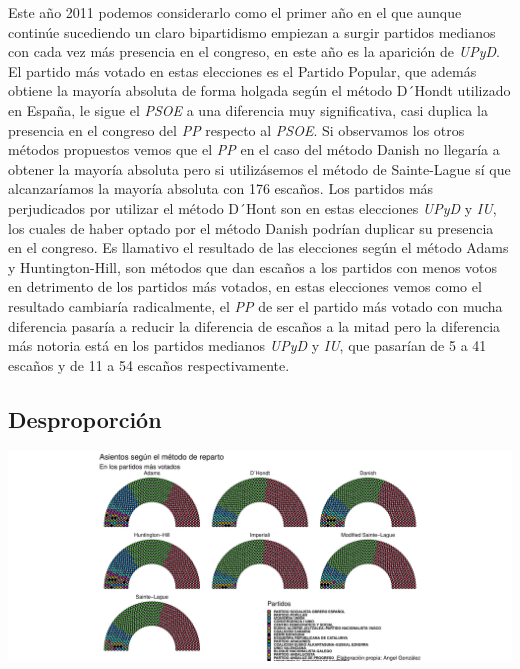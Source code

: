 \documentclass[12pt,a4paper,]{book}
\numberwithin{dummy}{section}
\theoremstyle{ocrenumbox}
\theoremstyle{blacknumex}
\theoremstyle{blacknumbox}
\theoremstyle{ocrenum}
\theoremstyle{ocrenum}
\begin{document}
Este año 2011 podemos considerarlo como el primer año en el que aunque
continúe sucediendo un claro bipartidismo empiezan a surgir partidos
medianos con cada vez más presencia en el congreso, en este año es la
aparición de \emph{UPyD}. El partido más votado en estas elecciones es
el Partido Popular, que además obtiene la mayoría absoluta de forma
holgada según el método D´Hondt utilizado en España, le sigue el
\emph{PSOE} a una diferencia muy significativa, casi duplica la
presencia en el congreso del \emph{PP} respecto al \emph{PSOE}. Si
observamos los otros métodos propuestos vemos que el \emph{PP} en el
caso del método Danish no llegaría a obtener la mayoría absoluta pero si
utilizásemos el método de Sainte-Lague sí que alcanzaríamos la mayoría
absoluta con 176 escaños. Los partidos más perjudicados por utilizar el
método D´Hont son en estas elecciones \emph{UPyD} y \emph{IU}, los
cuales de haber optado por el método Danish podrían duplicar su
presencia en el congreso. Es llamativo el resultado de las elecciones
según el método Adams y Huntington-Hill, son métodos que dan escaños a
los partidos con menos votos en detrimento de los partidos más votados,
en estas elecciones vemos como el resultado cambiaría radicalmente, el
\emph{PP} de ser el partido más votado con mucha diferencia pasaría a
reducir la diferencia de escaños a la mitad pero la diferencia más
notoria está en los partidos medianos \emph{UPyD} y \emph{IU}, que
pasarían de 5 a 41 escaños y de 11 a 54 escaños respectivamente.

\hypertarget{desproporciuxf3n-10}{%
\subsection{Desproporción}\label{desproporciuxf3n-10}}

\begin{center}\includegraphics[width=1\linewidth]{figurasR/unnamed-chunk-107-1} \end{center}
\end{document}
